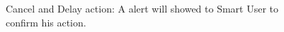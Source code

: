 \begin{figure}[H]
  \caption{Cancel and Delay action: A alert will showed to Smart User to confirm his action.}
\end{figure}



